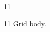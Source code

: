 \documentclass[paper=A4]{ropas-poster}
\begin{document}
\begin{postergrid}{1}{1}
\begin{posterblock}{1}{1}
Grid body.
\end{posterblock}
\end{postergrid}
\end{document}
